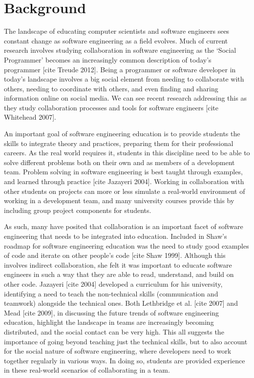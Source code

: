 \chapter{Background}

The landscape of educating computer scientists and software engineers sees constant change as software engineering as a field evolves. Much of current research involves studying collaboration in software engineering as the ‘Social Programmer’ becomes an increasingly common description of today’s programmer [cite Treude 2012]. Being a programmer or software developer in today’s landscape involves a big social element from needing to collaborate with others, needing to coordinate with others, and even finding and sharing information online on social media. We can see recent research addressing this as they study collaboration processes and tools for software engineers [cite Whitehead 2007].

An important goal of software engineering education is to provide students the skills to integrate theory and practices, preparing them for their professional careers. As the real world requires it, students in this discipline need to be able to solve different problems both on their own and as members of a development team. Problem solving in software engineering is best taught through examples, and learned through practice [cite Jazayeri 2004]. Working in collaboration with other students on projects can more or less simulate a real-world environment of working in a development team, and many university courses provide this by including group project components for students.

As such, many have posited that collaboration is an important facet of software engineering that needs to be integrated into education. Included in Shaw’s roadmap for software engineering education was the need to study good examples of code and iterate on other people’s code [cite Shaw 1999]. Although this involves indirect collaboration, she felt it was important to educate software engineers in such a way that they are able to read, understand, and build on other code. Jazayeri [cite 2004] developed a curriculum for his university, identifying a need to teach the non-technical skills (communication and teamwork) alongside the technical ones. Both Lethbridge et al. [cite 2007] and Mead [cite 2009], in discussing the future trends of software engineering education, highlight the landscape in teams are increasingly becoming distributed, and the social contact can be very high. This all suggests the importance of going beyond teaching just the technical skills, but to also account for the social nature of software engineering, where developers need to work together regularly in various ways. In doing so, students are provided experience in these real-world scenarios of collaborating in a team.

